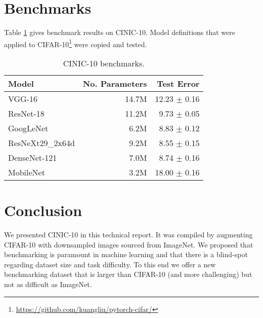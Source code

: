 \documentclass[coverpage]{Style/inftechrep}
\begin{document}
\section{Benchmarks}

Table \ref{tab:bench} gives benchmark results on CINIC-10. Model definitions that were applied to CIFAR-10\footnote{\url{https://github.com/kuangliu/pytorch-cifar/}} were copied and tested. 

\begin{table}[!htbp]
\def\arraystretch{1.5}
\caption{CINIC-10 benchmarks.}\label{tab:bench}
\centering
\begin{tabular}{lrr}
\hline
\textbf{Model}              & \textbf{No. Parameters} & \textbf{Test Error} \\
\hline
VGG-16             & 14.7M          & 12.23 $\pm$ 0.16   \\
ResNet-18          & 11.2M          & 9.73 $\pm$ 0.05    \\
GoogLeNet          & 6.2M           & 8.83 $\pm$ 0.12    \\
ResNeXt29\_2x64d   & 9.2M           & 8.55 $\pm$ 0.15    \\
DenseNet-121       & 7.0M           & 8.74 $\pm$ 0.16    \\
MobileNet          & 3.2M           & 18.00 $\pm$ 0.16   \\
\hline
\end{tabular}

\end{table}

\section{Conclusion}
We presented CINIC-10 in this technical report. It was compiled by augmenting CIFAR-10 with downsampled images sourced from ImageNet. We proposed that benchmarking is paramount in machine learning and that there is a blind-spot regarding dataset size and task difficulty. To this end we offer a new benchmarking dataset that is larger than CIFAR-10 (and more challenging) but not as difficult as ImageNet.






\end{document}
